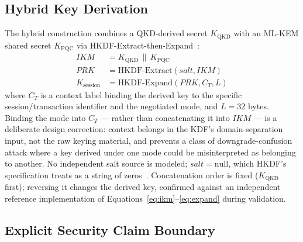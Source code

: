 \documentclass[journal]{IEEEtran}
\begin{document}
\subsection{Hybrid Key Derivation}
\label{sec:hybridderiv}

The hybrid construction combines a QKD-derived secret $K_{\text{QKD}}$ with an ML-KEM shared secret $K_{\text{PQC}}$ via HKDF-Extract-then-Expand~\cite{krawczyk2010hkdf}:
\begin{align}
IKM &= K_{\text{QKD}} \,\|\, K_{\text{PQC}} \label{eq:ikm}\\
PRK &= \mathrm{HKDF\text{-}Extract}(salt, IKM) \label{eq:extract}\\
K_{\text{session}} &= \mathrm{HKDF\text{-}Expand}(PRK, C_T, L) \label{eq:expand}
\end{align}
where $C_T$ is a context label binding the derived key to the specific session/transaction identifier and the negotiated mode, and $L = 32$ bytes. Binding the mode into $C_T$ --- rather than concatenating it into $IKM$ --- is a deliberate design correction: context belongs in the KDF's domain-separation input, not the raw keying material, and prevents a class of downgrade-confusion attack where a key derived under one mode could be misinterpreted as belonging to another. No independent salt source is modeled; $salt = \mathrm{null}$, which HKDF's specification treats as a string of zeros~\cite{krawczyk2010hkdf}. Concatenation order is fixed ($K_{\text{QKD}}$ first); reversing it changes the derived key, confirmed against an independent reference implementation of Equations~\eqref{eq:ikm}--\eqref{eq:expand} during validation.

\subsection{Explicit Security Claim Boundary}
\label{sec:securityclaim}
\end{document}
